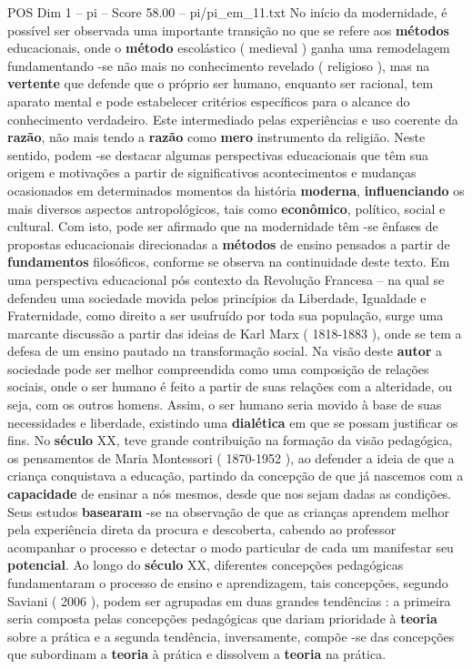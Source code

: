 \begin{textsample}{POS Dim 1 – pi – Score 58.00 – pi/pi\_em\_11.txt}
No início da modernidade, é possível ser observada uma importante transição no que se refere aos \textbf{métodos} educacionais, onde o \textbf{método} escolástico ( medieval ) ganha uma remodelagem fundamentando -se não mais no conhecimento revelado ( religioso ), mas na \textbf{vertente} que defende que o próprio ser humano, enquanto ser racional, tem aparato mental e pode estabelecer critérios específicos para o alcance do conhecimento verdadeiro.
Este intermediado pelas experiências e uso coerente da \textbf{razão}, não mais tendo a \textbf{razão} como \textbf{mero} instrumento da religião.
Neste sentido, podem -se destacar algumas perspectivas educacionais que têm sua origem e motivações a partir de significativos acontecimentos e mudanças ocasionados em determinados momentos da história \textbf{moderna}, \textbf{influenciando} os mais diversos aspectos antropológicos, tais como \textbf{econômico}, político, social e cultural.
Com isto, pode ser afirmado que na modernidade têm -se ênfases de propostas educacionais direcionadas a \textbf{métodos} de ensino pensados a partir de \textbf{fundamentos} filosóficos, conforme se observa na continuidade deste texto.
Em uma perspectiva educacional pós contexto da Revolução Francesa – na qual se defendeu uma sociedade movida pelos princípios da Liberdade, Igualdade e Fraternidade, como direito a ser usufruído por toda sua população, surge uma marcante discussão a partir das ideias de Karl Marx ( 1818-1883 ), onde se tem a defesa de um ensino pautado na transformação social.
Na visão deste \textbf{autor} a sociedade pode ser melhor compreendida como uma composição de relações sociais, onde o ser humano é feito a partir de suas relações com a alteridade, ou seja, com os outros homens.
Assim, o ser humano seria movido à base de suas necessidades e liberdade, existindo uma \textbf{dialética} em que se possam justificar os fins.
No \textbf{século} XX, teve grande contribuição na formação da visão pedagógica, os pensamentos de Maria Montessori ( 1870-1952 ), ao defender a ideia de que a criança conquistava a educação, partindo da concepção de que já nascemos com a \textbf{capacidade} de ensinar a nós mesmos, desde que nos sejam dadas as condições.
Seus estudos \textbf{basearam} -se na observação de que as crianças aprendem melhor pela experiência direta da procura e descoberta, cabendo ao professor acompanhar o processo e detectar o modo particular de cada um manifestar seu \textbf{potencial}.
Ao longo do \textbf{século} XX, diferentes concepções pedagógicas fundamentaram o processo de ensino e aprendizagem, tais concepções, segundo Saviani ( 2006 ), podem ser agrupadas em duas grandes tendências : a primeira seria composta pelas concepções pedagógicas que dariam prioridade à \textbf{teoria} sobre a prática e a segunda tendência, inversamente, compõe -se das concepções que subordinam a \textbf{teoria} à prática e dissolvem a \textbf{teoria} na prática.

\end{textsample}
